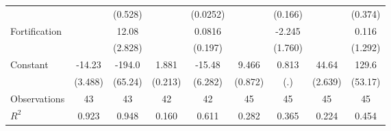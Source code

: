 {\begin{tabular}{l*{8}{c}}
                &                  &  (0.528)         &                  & (0.0252)         &                  &  (0.166)         &                  &  (0.374)         \\
[1em]
Fortification   &                  &    12.08\sym{***}&                  &   0.0816         &                  &   -2.245         &                  &    0.116         \\
                &                  &  (2.828)         &                  &  (0.197)         &                  &  (1.760)         &                  &  (1.292)         \\
[1em]
Constant        &   -14.23\sym{***}&   -194.0\sym{***}&    1.881\sym{***}&   -15.48\sym{**} &    9.466\sym{***}&    0.813         &    44.64\sym{***}&    129.6\sym{**} \\
                &  (3.488)         &  (65.24)         &  (0.213)         &  (6.282)         &  (0.872)         &      (.)         &  (2.639)         &  (53.17)         \\
\hline
Observations    &       43         &       43         &       42         &       42         &       45         &       45         &       45         &       45         \\
\(R^{2}\)       &    0.923         &    0.948         &    0.160         &    0.611         &    0.282         &    0.365         &    0.224         &    0.454         \\
\hline\hline
\end{tabular}
}
